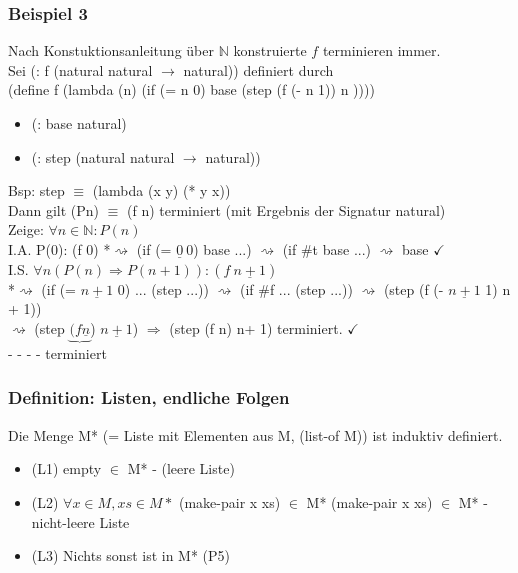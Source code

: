 \documentclass[a4paper, 20pt, openany]{book}
\begin{document}
\subsubsection{Beispiel 3}
Nach Konstuktionsanleitung über $\mathbb{N}$ konstruierte $f$ terminieren immer.\\
 Sei (: f (natural natural $\rightarrow$ natural)) definiert durch\\
(define f (lambda (n)
(if (= n 0) base (step (f (- n 1)) n ))))\\ 
 \begin{itemize}
 \item (: base natural)
 \item (: step (natural natural $\rightarrow$ natural))
 \end{itemize}
 
Bsp: step $\equiv$ (lambda (x y) (* y x))\\
Dann gilt (Pn) $\equiv$ (f n) terminiert (mit Ergebnis der Signatur natural)\\

 Zeige: $\forall n \in \mathbb{N} : P(n)$\\
 I.A. P(0): (f 0) *$\rightsquigarrow$ (if (= $\underline{0}  \ 0$) base ...) $\rightsquigarrow$ (if \#t base ...) $\rightsquigarrow$ base $\checkmark$\\
 I.S. $\forall n  (P(n) \Rightarrow P (n+1)):(f \  \underline{n + 1})$\\
 *$\rightsquigarrow$ (if (= $\underline{n + 1}$ 0) ... (step ...)) $\rightsquigarrow$ (if \#f ... (step ...)) $\rightsquigarrow$ (step (f (- $\underline{n +1}$ 1) n + 1))\\ $\rightsquigarrow$ (step $\underbrace{(f \underline{n}}$) $\underline{n + 1}$) $\Rightarrow$ (step (f n) n+ 1) terminiert. $\checkmark$\\
 - - - - terminiert
 
 \subsubsection{Definition: Listen, endliche Folgen}
Die Menge M* (= Liste mit Elementen aus M, (list-of M)) ist induktiv definiert.\\
\begin{itemize}
\item (L1) empty $\in$ M* - (leere Liste)
\item (L2) $\forall x \in M, xs \in M*$ (make-pair x xs) $\in$ M* (make-pair x xs) $\in$ M* - nicht-leere Liste
\item (L3) Nichts sonst ist in M* (P5)
\end{itemize}
\end{document}
